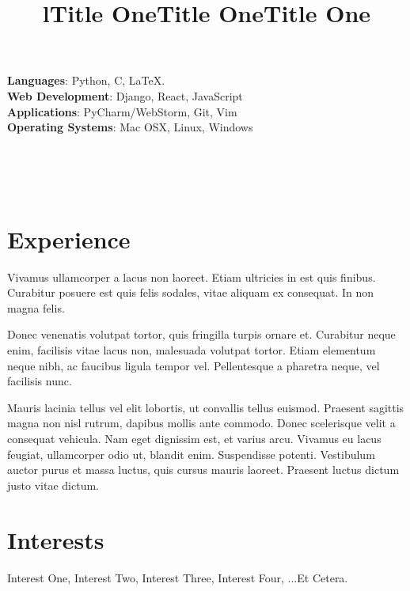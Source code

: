 \documentclass[margin]{res}
\begin{document}
\begin{resume}
    \textbf{Languages}: Python, C, \LaTeX.
    \\
    \textbf{Web Development}: Django, React, JavaScript
    \\
    \textbf{Applications}: PyCharm/WebStorm, Git, Vim
    \\
    \textbf{Operating Systems}: 
    Mac OSX, Linux, Windows

  \begin{format}
    \title{l}\\
    \\
    \body\\
  \end{format}

  \section{Experience}
    \title{\textbf{Title One}}
    \begin{position}
      Vivamus ullamcorper a lacus non laoreet. Etiam ultricies in est quis finibus. 
      Curabitur posuere est quis felis sodales, vitae aliquam ex consequat. In non 
      magna felis.
    \end{position}

    \title{\textbf{Title One}}
    \begin{position}
      Donec venenatis volutpat tortor, quis fringilla turpis ornare et. Curabitur 
      neque enim, facilisis vitae lacus non, malesuada volutpat tortor. Etiam 
      elementum neque nibh, ac faucibus ligula tempor vel. Pellentesque a pharetra 
      neque, vel facilisis nunc.
    \end{position}

    \title{\textbf{Title One}}
    \begin{position}
      Mauris lacinia tellus vel elit lobortis, ut convallis tellus euismod. Praesent 
      sagittis magna non nisl rutrum, dapibus mollis ante commodo. Donec scelerisque 
      velit a consequat vehicula. Nam eget dignissim est, et varius arcu. Vivamus eu 
      lacus feugiat, ullamcorper odio ut, blandit enim. Suspendisse potenti. 
      Vestibulum auctor purus et massa luctus, quis cursus mauris laoreet. Praesent 
      luctus dictum justo vitae dictum.
    \end{position}

  \section{Interests}
    Interest One, Interest Two, Interest Three, Interest Four, ...Et Cetera.

\end{resume}
\end{document}
